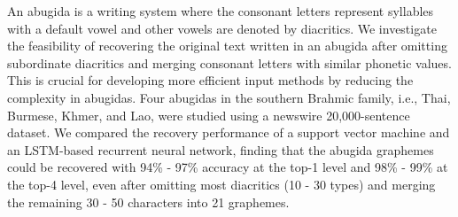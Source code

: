 An abugida is a writing system where the consonant letters represent syllables with a default vowel and other vowels are denoted by diacritics. We investigate the feasibility of recovering the original text written in an abugida after omitting subordinate diacritics and merging consonant letters with similar phonetic values. This is crucial for developing more efficient input methods by reducing the complexity in abugidas. Four abugidas in the southern Brahmic family, i.e., Thai, Burmese, Khmer, and Lao, were studied using a newswire 20,000-sentence dataset. We compared the recovery performance of a support vector machine and an LSTM-based recurrent neural network, finding that the abugida graphemes could be recovered with 94\% - 97\% accuracy at the top-1 level and 98\% - 99\% at the top-4 level, even after omitting most diacritics (10 - 30 types) and merging the remaining 30 - 50 characters into 21 graphemes.
